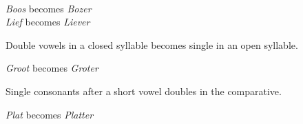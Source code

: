 \documentclass[letterpaper,11pt]{article}
\begin{document}
\\
\begin{small}
    \indent \textit{Boos} becomes \textit{Bozer} \\
    \indent \textit{Lief} becomes \textit{Liever} \\
\end{small}
Double vowels in a closed syllable becomes single in an open syllable.
\\
\begin{small}
    \indent \textit{Groot} becomes \textit{Groter} \\
\end{small}
Single consonants after a short vowel doubles in the comparative.
\\
\begin{small}
    \indent \textit{Plat} becomes \textit{Platter} \\
\end{small}
\end{document}
